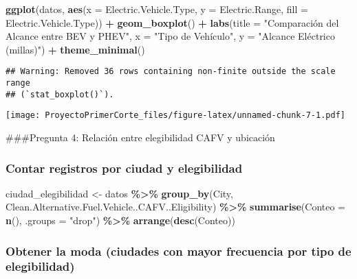 \documentclass[
]{article}
\newenvironment{Shaded}{\begin{snugshade}}{\end{snugshade}}
\newcommand{\AttributeTok}[1]{\textcolor[rgb]{0.13,0.29,0.53}{#1}}
\newcommand{\FunctionTok}[1]{\textcolor[rgb]{0.13,0.29,0.53}{\textbf{#1}}}
\newcommand{\NormalTok}[1]{#1}
\newcommand{\OtherTok}[1]{\textcolor[rgb]{0.56,0.35,0.01}{#1}}
\newcommand{\SpecialCharTok}[1]{\textcolor[rgb]{0.81,0.36,0.00}{\textbf{#1}}}
\newcommand{\StringTok}[1]{\textcolor[rgb]{0.31,0.60,0.02}{#1}}
\begin{document}
\begin{Shaded}
\begin{Highlighting}[]
\FunctionTok{ggplot}\NormalTok{(datos, }\FunctionTok{aes}\NormalTok{(}\AttributeTok{x =}\NormalTok{ Electric.Vehicle.Type, }\AttributeTok{y =}\NormalTok{ Electric.Range, }\AttributeTok{fill =}
\NormalTok{Electric.Vehicle.Type)) }\SpecialCharTok{+} \FunctionTok{geom\_boxplot}\NormalTok{() }\SpecialCharTok{+} \FunctionTok{labs}\NormalTok{(}\AttributeTok{title =} \StringTok{"Comparación del}
\StringTok{Alcance entre BEV y PHEV"}\NormalTok{, }\AttributeTok{x =} \StringTok{"Tipo de Vehículo"}\NormalTok{, }\AttributeTok{y =} \StringTok{"Alcance}
\StringTok{Eléctrico (millas)"}\NormalTok{) }\SpecialCharTok{+} \FunctionTok{theme\_minimal}\NormalTok{()}
\end{Highlighting}
\end{Shaded}

\begin{verbatim}
## Warning: Removed 36 rows containing non-finite outside the scale range
## (`stat_boxplot()`).
\end{verbatim}

\texttt{[image: ProyectoPrimerCorte\_files/figure-latex/unnamed-chunk-7-1.pdf]}

\#\#\#Pregunta 4: Relación entre elegibilidad CAFV y ubicación

\subsubsection{Contar registros por ciudad y
elegibilidad}\label{contar-registros-por-ciudad-y-elegibilidad}

\begin{Shaded}
\begin{Highlighting}[]
\NormalTok{ciudad\_elegibilidad }\OtherTok{\textless{}{-}}\NormalTok{ datos }\SpecialCharTok{\%\textgreater{}\%}
  \FunctionTok{group\_by}\NormalTok{(City, Clean.Alternative.Fuel.Vehicle..CAFV..Eligibility) }\SpecialCharTok{\%\textgreater{}\%}
  \FunctionTok{summarise}\NormalTok{(}\AttributeTok{Conteo =} \FunctionTok{n}\NormalTok{(), }\AttributeTok{.groups =} \StringTok{"drop"}\NormalTok{) }\SpecialCharTok{\%\textgreater{}\%}
  \FunctionTok{arrange}\NormalTok{(}\FunctionTok{desc}\NormalTok{(Conteo))}
\end{Highlighting}
\end{Shaded}

\subsubsection{Obtener la moda (ciudades con mayor frecuencia por tipo
de
elegibilidad)}\label{obtener-la-moda-ciudades-con-mayor-frecuencia-por-tipo-de-elegibilidad}
\end{document}
